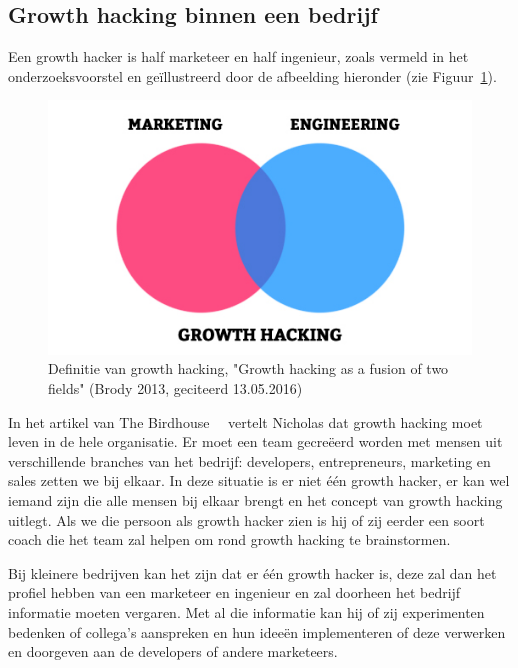 \subsection{Growth hacking binnen een bedrijf} \label{sec:growth-hacker-functie}
Een growth hacker is half marketeer en half ingenieur, zoals vermeld in het onderzoeksvoorstel en geïllustreerd door de afbeelding hieronder (zie Figuur~\ref{fig:definitionGrowthHacker}).
\begin{figure}[h!]
	\includegraphics[width=\linewidth]{img/growth-hacker-definition.jpg}
	\centering
	\caption{Definitie van growth hacking, "Growth hacking as a fusion of two fields"  (Brody 2013, geciteerd 13.05.2016)}
	\label{fig:definitionGrowthHacker}
\end{figure}

In het artikel van The Birdhouse~\autocite{Birdhouse2019}~ vertelt Nicholas dat growth hacking moet leven in de hele organisatie. Er moet een team gecreëerd worden met mensen uit verschillende branches van het bedrijf: developers, entrepreneurs, marketing en sales zetten we bij elkaar. In deze situatie is er niet één growth hacker, er kan wel iemand zijn die alle mensen bij elkaar brengt en het concept van growth hacking uitlegt. Als we die persoon als growth hacker zien is hij of zij eerder een soort coach die het team zal helpen om rond growth hacking te brainstormen.

Bij kleinere bedrijven kan het zijn dat er één growth hacker is, deze zal dan het profiel hebben van een marketeer en ingenieur en zal doorheen het bedrijf informatie moeten vergaren. Met al die informatie kan hij of zij experimenten bedenken of collega's aanspreken en hun ideeën implementeren of deze verwerken en doorgeven aan de developers of andere marketeers. 


